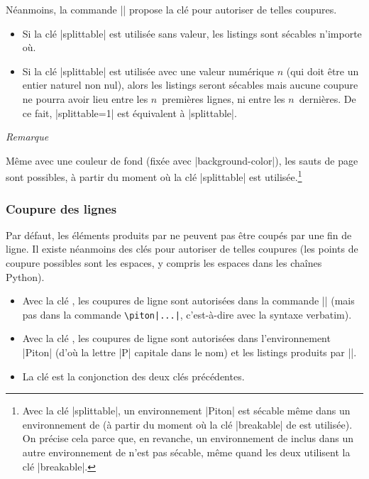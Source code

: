 \documentclass[dvipsnames,svgnames]{article}
\begin{document}
Néanmoins, la commande |\PitonOptions| propose la clé  pour autoriser de telles coupures.

\begin{itemize}
\item Si la clé |splittable| est utilisée sans valeur, les listings sont sécables n'importe où.

\item Si la clé |splittable| est utilisée avec une valeur numérique $n$ (qui doit être un entier naturel non nul),
alors les listings seront sécables mais aucune coupure ne pourra avoir lieu entre les $n$~premières lignes, ni
entre les $n$~dernières. De ce fait, |splittable=1| est équivalent à |splittable|.
\end{itemize}

\medskip
\emph{Remarque}\par\nobreak

Même avec une couleur de fond (fixée avec |background-color|), les sauts de page sont possibles, à partir du moment
où la clé |splittable| est utilisée.\footnote{Avec la clé |splittable|, un environnement |{Piton}| est sécable même dans un environnement de
   (à partir du moment où la clé |breakable| de  est utilisée). On précise cela parce
  que, en revanche, un environnement de  inclus dans un autre environnement de  n'est
  pas sécable, même quand les deux utilisent la clé |breakable|.}

\subsubsection{Coupure des lignes}

\label{line-breaks}

Par défaut, les éléments produits par  ne peuvent pas être coupés par une fin de ligne. Il existe
néanmoins des clés pour autoriser de telles coupures (les points de coupure possibles sont les espaces, y compris
les espaces dans les chaînes Python).
\begin{itemize}
\item {} Avec la clé , les coupures de ligne sont autorisées dans la commande
|| (mais pas dans la commande \verb+\piton|...|+, c'est-à-dire avec la syntaxe verbatim). 

\item {} Avec la clé , les coupures de ligne sont autorisées dans l'environnement
|{Piton}| (d'où la lettre |P| capitale dans le nom) et les listings produits par |\PitonInputFile|.

\item {} La clé  est la conjonction des deux clés précédentes.
\end{itemize}
\end{document}
